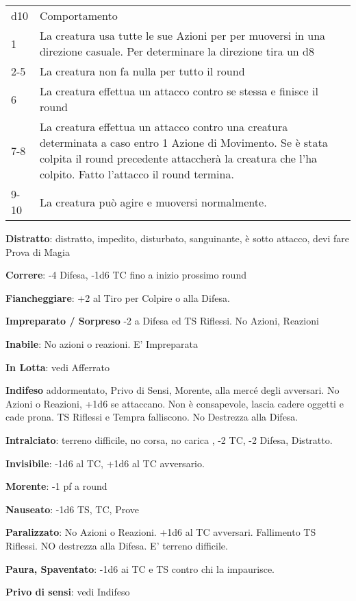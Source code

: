 \documentclass[a4paper,12 pt,openany]{book}
\begin{document}
\begin{textblock*}{19 cm}
\begin{multicols}{2}
\begin{tabularx}{0.45\textwidth}{lX}
	\hline
	d10 & Comportamento\\
	1 & La creatura usa tutte le sue Azioni per per muoversi in una direzione casuale. Per determinare la direzione tira un d8\\
	2-5 & La creatura non fa nulla per tutto il round\\
	6 & La creatura effettua un attacco contro se stessa e finisce il round\\
	7-8 & La creatura effettua un attacco contro una creatura determinata a caso entro 1 Azione di Movimento. Se è stata colpita il round precedente attaccherà la creatura che l'ha colpito. Fatto l'attacco il round termina.\\
	9-10 & La creatura può agire e muoversi normalmente.
\end{tabularx}


\textbf{Distratto}: distratto, impedito, disturbato, sanguinante, è sotto attacco, devi fare Prova di Magia

\textbf{Correre}: -4 Difesa, -1d6 TC fino a inizio prossimo round

\textbf{Fiancheggiare}: +2 al Tiro per Colpire o alla Difesa.

\textbf{Impreparato / Sorpreso} -2 a Difesa ed TS Riflessi. No Azioni, Reazioni

\textbf{Inabile}: No azioni o reazioni. E' Impreparata

\textbf{In Lotta}: vedi Afferrato

\textbf{Indifeso} addormentato, Privo di Sensi, Morente, alla mercé degli avversari. No Azioni o Reazioni, +1d6 se attaccano. Non è consapevole, lascia cadere oggetti e cade prona. TS Riflessi e Tempra falliscono. No Destrezza alla Difesa.

\textbf{Intralciato}: terreno difficile, no corsa, no carica , -2 TC, -2 Difesa, Distratto.

\textbf{Invisibile}: -1d6 al TC, +1d6 al TC avversario.

\textbf{Morente}: -1 pf a round

\textbf{Nauseato}: -1d6 TS, TC, Prove

\textbf{Paralizzato}: No Azioni o Reazioni. +1d6 al TC avversari. Fallimento TS Riflessi. NO destrezza alla Difesa. E' terreno difficile.

\textbf{Paura, Spaventato}: -1d6 ai TC e TS contro chi la impaurisce.

\textbf{Privo di sensi}: vedi Indifeso


\end{multicols}
\end{textblock*}
\end{document}
